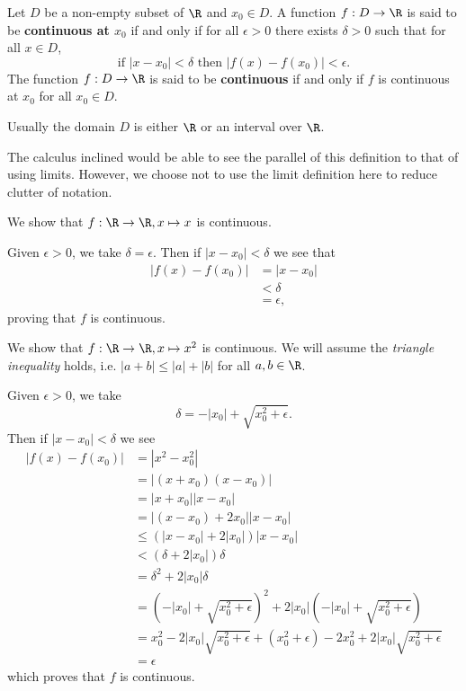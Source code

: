 \begin{definition}
    Let $D$ be a non-empty subset of $\R$ and $x_0 \in D$. A function $f: D \to \R$ is said to be \textbf{continuous at $x_0$} if and only if for all $\epsilon > 0$ there exists $\delta > 0$ such that for all $x \in D$,
    \[
        \text{if } |x - x_0| < \delta \text{ then } |f(x) - f(x_0)| < \epsilon.
    \]
    The function $f: D \to \R$ is said to be \textbf{continuous} if and only if $f$ is continuous at $x_0$ for all $x_0 \in D$.
\end{definition}
\begin{remark}
    Usually the domain $D$ is either $\R$ or an interval over $\R$.
\end{remark}

The calculus inclined would be able to see the parallel of this definition to that of using limits. However, we choose not to use the limit definition here to reduce clutter of notation.

\begin{example}
    We show that $f: \R \to \R, x \mapsto x$ is continuous.

    Given $\epsilon > 0$, we take $\delta = \epsilon$. Then if $|x - x_0| < \delta$ we see that
    \begin{align*}
        |f(x) - f(x_0)| &= |x - x_0|\\
        &< \delta\\
        &= \epsilon,
    \end{align*}
    proving that $f$ is continuous.
\end{example}

\begin{example}
    We show that $f: \R \to \R, x \mapsto x^2$ is continuous. We will assume the \textit{triangle inequality} holds, i.e. $|a+b| \leq |a| + |b|$ for all $a,b \in \R$.

    Given $\epsilon > 0$, we take
    \[
        \delta = -|x_0| + \sqrt{x_0^2 + \epsilon}.
    \]
    Then if $|x - x_0| < \delta$ we see
    \begin{align*}
        |f(x) - f(x_0)| &= |x^2 - x_0^2|\\
        &= |(x+x_0)(x-x_0)|\\
        &= |x+x_0||x-x_0|\\
        &= |(x-x_0)+2x_0||x-x_0|\\
        &\leq (|x-x_0| + 2|x_0|)|x-x_0|\\
        &< (\delta + 2|x_0|)\delta\\
        &= \delta^2 + 2|x_0|\delta\\
        &= \left(-|x_0| + \sqrt{x_0^2 + \epsilon}\right)^2 + 2|x_0|\left(-|x_0| + \sqrt{x_0^2 + \epsilon}\right)\\
        &= x_0^2 - 2|x_0|\sqrt{x_0^2+\epsilon} + (x_0^2 + \epsilon) - 2x_0^2 + 2|x_0|\sqrt{x_0^2+\epsilon}\\
        &= \epsilon
    \end{align*}
    which proves that $f$ is continuous.
\end{example}

